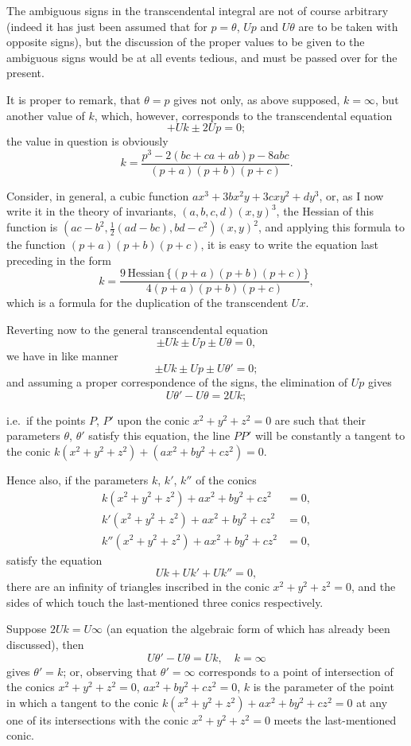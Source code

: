 \documentclass[11pt]{article}
\begin{document}
The ambiguous signs in the transcendental integral are not of course arbitrary (indeed it has just been assumed that for $p=\theta$, $Up$ and $U\theta$ are to be taken with opposite signs), but the discussion of the proper values to be given to the ambiguous signs would be at all events tedious, and must be passed over for the present.

It is proper to remark, that $\theta=p$ gives not only, as above supposed, $k=\infty$, but another value of $k$, which, however, corresponds to the transcendental equation
\[
+ Uk \pm 2Up = 0;
\]
the value in question is obviously
\[
k = \frac{p^3 - 2(bc+ca+ab)p - 8abc}{(p+a)(p+b)(p+c)}.
\]

Consider, in general, a cubic function $ax^3 + 3bx^2y + 3cxy^2 + dy^3$, or, as I now write it in the theory of invariants, $(a,b,c,d)(x,y)^3$, the Hessian of this function is $(ac-b^2, \frac{1}{2}(ad-bc), bd-c^2)(x,y)^2$, and applying this formula to the function $(p+a)(p+b)(p+c)$, it is easy to write the equation last preceding in the form
\[
k = \frac{9\,\text{Hessian}\,\{(p+a)(p+b)(p+c)\}}{4(p+a)(p+b)(p+c)},
\]
which is a formula for the duplication of the transcendent $Ux$.

Reverting now to the general transcendental equation
\[
\pm Uk \pm Up \pm U\theta = 0,
\]
we have in like manner
\[
\pm Uk \pm Up \pm U\theta' = 0;
\]
and assuming a proper correspondence of the signs, the elimination of $Up$ gives
\[
U\theta' - U\theta = 2Uk;
\]

\newpage
\setcounter{page}{56}

i.e.\ if the points $P$, $P'$ upon the conic $x^2+y^2+z^2=0$ are such that their parameters $\theta$, $\theta'$ satisfy this equation, the line $PP'$ will be constantly a tangent to the conic $k(x^2+y^2+z^2)+(ax^2+by^2+cz^2)=0$.

Hence also, if the parameters $k$, $k'$, $k''$ of the conics
\begin{align*}
k(x^2+y^2+z^2) + ax^2 + by^2 + cz^2 &= 0,\\
k'(x^2+y^2+z^2) + ax^2 + by^2 + cz^2 &= 0,\\
k''(x^2+y^2+z^2) + ax^2 + by^2 + cz^2 &= 0,
\end{align*}
satisfy the equation
\[
Uk + Uk' + Uk'' = 0,
\]
there are an infinity of triangles inscribed in the conic $x^2+y^2+z^2=0$, and the sides of which touch the last-mentioned three conics respectively.

Suppose $2Uk = U\infty$ (an equation the algebraic form of which has already been discussed), then
\[
U\theta' - U\theta = Uk, \quad k = \infty
\]
gives $\theta' = k$; or, observing that $\theta' = \infty$ corresponds to a point of intersection of the conics $x^2+y^2+z^2=0$, $ax^2+by^2+cz^2=0$, $k$ is the parameter of the point in which a tangent to the conic $k(x^2+y^2+z^2)+ax^2+by^2+cz^2=0$ at any one of its intersections with the conic $x^2+y^2+z^2=0$ meets the last-mentioned conic.
\end{document}

